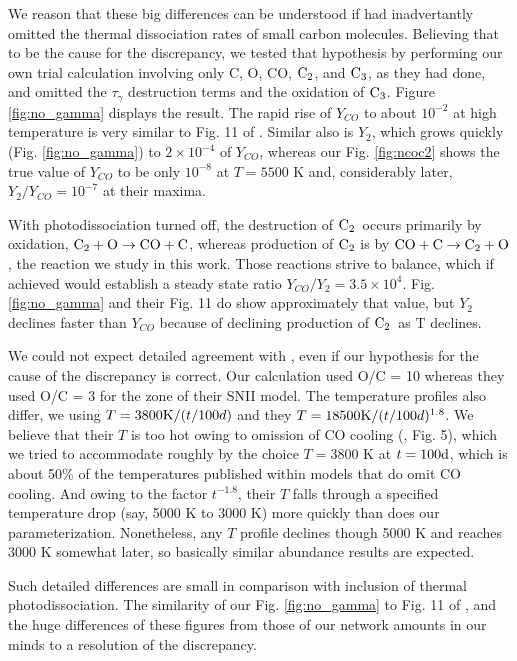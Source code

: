 \documentclass[manuscript]{aastex}
\newcommand{\ctwo}{{\rm C}_2}
\newcommand{\cthree}{{\rm C}_3}
\newcommand{\coctoctwo}{${\rm CO} + {\rm C} \to \ctwo + {\rm O}$}
\newcommand{\ctowotococ}{$\ctwo + {\rm O} \to {\rm CO} + {\rm C}$}
\begin{document}
\begin{CJK*}{UTF8}{gbsn}
\begin{enumerate}
\end{enumerate}
We reason that these big differences can be understood if
\citet{2009ApJ...703..642C} had inadvertantly omitted the thermal
dissociation rates of small carbon molecules. Believing that to be the
cause for the discrepancy, we tested that hypothesis by performing our
own trial calculation involving only C, O, CO, $\ctwo$, and $\cthree$,
as they had done,
and omitted the $\tau_\gamma$ destruction terms and the oxidation of $\cthree$.
Figure \ref{fig:no_gamma} displays the result.
The rapid rise of $Y_{CO}$ to about $10^{-2}$ at high temperature is very 
similar to Fig. 11 of \citet{2009ApJ...703..642C}.
Similar also is $Y_2$,
which grows quickly (Fig. \ref{fig:no_gamma}) to $2 \times 10^{-4}$ of $Y_{CO}$,
whereas our Fig. \ref{fig:ncoc2} shows the true value of $Y_{CO}$ to be
only $10^{-8}$ at $T=5500$ K and, considerably later,
$Y_2/Y_{CO} = 10^{-7}$ at their maxima. 

With photodissociation turned off, the destruction of $\ctwo$\ occurs primarily
by oxidation, \ctowotococ, whereas production of $\ctwo$ is by
\coctoctwo, the reaction we study in this work.
Those reactions strive to balance, which if achieved would
establish a steady state
ratio $Y_{CO}/Y_2 = 3.5 \times 10^4$. Fig. \ref{fig:no_gamma}
and their Fig. 11 do show
approximately that value, but $Y_2$ declines faster than $Y_{CO}$
because of declining production of $\ctwo$\ as T declines.

We could not expect detailed agreement with \citet{2009ApJ...703..642C},
even if our hypothesis for the
cause of the discrepancy is correct. Our calculation used
O/C = 10 whereas they used O/C = 3 for the zone of their SNII model.
The temperature profiles also differ, we using $T=3800 {\rm K}/(t/100d)$
and they $T=18500 {\rm K}/(t/100d)^{1.8}$.
We believe that their $T$ is too hot owing to omission of CO cooling
(\citealp{1996ApJ...471..480L}, Fig. 5),
which we tried to accommodate roughly by
the choice $T=3800$ K at $t=100 {\rm d}$,
which is about 50\% of the temperatures
published within models that do omit CO cooling. And owing to the
factor $t^{-1.8}$, their $T$ falls through a specified temperature drop
(say, 5000 K to 3000 K) more quickly than does our parameterization.
Nonetheless, any $T$ profile declines though 5000 K and reaches 3000 K
somewhat later, so basically similar abundance results are expected. 

Such detailed differences are small in comparison with inclusion of
thermal photodissociation. The similarity of our Fig. \ref{fig:no_gamma}
to Fig. 11 of \citet{2009ApJ...703..642C},
and the huge differences of these figures from those of our network
amounts in our minds to a resolution of the discrepancy. 


\end{CJK*}
\end{document}
